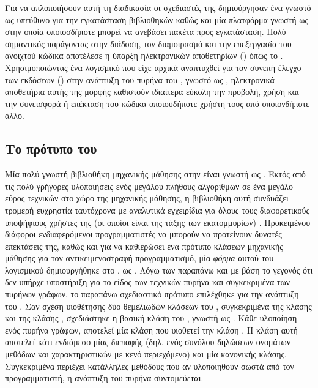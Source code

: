 Για να απλοποιήσουν αυτή τη διαδικασία οι σχεδιαστές της  δημιούργησαν ένα  γνωστό ως  υπεύθυνο για την εγκατάσταση βιβλιοθηκών καθώς και μία πλατφόρμα γνωστή ως  στην οποία οποιοσδήποτε μπορεί να ανεβάσει πακέτα προς εγκατάσταση.
Πολύ σημαντικός παράγοντας στην διάδοση, τον διαμοιρασμό και την επεξεργασία του ανοιχτού κώδικα αποτέλεσε η ύπαρξη ηλεκτρονικών αποθετηρίων () όπως το .
Χρησιμοποιώντας ένα λογισμικό που είχε αρχικά αναπτυχθεί για τον συνεπή έλεγχο των εκδόσεων () στην ανάπτυξη του πυρήνα του , γνωστό ως , ηλεκτρονικά αποθετήρια αυτής της μορφής καθιστούν ιδιαίτερα εύκολη την προβολή, χρήση και την συνεισφορά ή επέκταση του κώδικα οποιουδήποτε χρήστη τους από οποιονδήποτε άλλο.
\subsection{Το πρότυπο του }
Μία πολύ γνωστή βιβλιοθήκη μηχανικής μάθησης στην  είναι γνωστή ως .
Εκτός από τις πολύ γρήγορες υλοποιήσεις ενός μεγάλου πλήθους αλγορίθμων σε ένα μεγάλο εύρος τεχνικών στο χώρο της μηχανικής μάθησης, η βιβλιοθήκη αυτή συνδυάζει τρομερή ευχρηστία ταυτόχρονα με αναλυτικά εγχειρίδια για όλους τους διαφορετικούς υποψήφιους χρήστες της (οι οποίοι είναι της τάξης των εκατομμυρίων) \cite{scikit}.
Προκειμένου διάφοροι ενδιαφερόμενοι προγραμματιστές να μπορούν να προτείνουν δυνατές επεκτάσεις της, καθώς και για να καθιερώσει ένα πρότυπο κλάσεων μηχανικής μάθησης για τον αντικειμενοστραφή προγραμματισμό, μία \textit{φόρμα} αυτού του λογισμικού  δημιουργήθηκε στο , ως .
Λόγω των παραπάνω και με βάση το γεγονός ότι δεν υπήρχε υποστήριξη για το είδος των τεχνικών πυρήνα και συγκεκριμένα των πυρήνων γράφων, το παραπάνω σχεδιαστικό πρότυπο επιλέχθηκε για την ανάπτυξη του .
Σαν σχέση υιοθέτησης δύο θεμελιωδών κλάσεων του \texttt{}, συγκεκριμένα της κλάσης  και της κλάσης , σχεδιάστηκε η βασική κλάση του , γνωστή ως .
Κάθε υλοποίηση ενός πυρήνα γράφων, αποτελεί μία κλάση που υιοθετεί την κλάση . 
Η κλάση αυτή αποτελεί κάτι ενδιάμεσο μίας διεπαφής (δηλ. ενός συνόλου δηλώσεων ονομάτων μεθόδων και χαρακτηριστικών με κενό περιεχόμενο) και μία κανονικής κλάσης.
Συγκεκριμένα περιέχει κατάλληλες μεθόδους που αν υλοποιηθούν σωστά από τον προγραμματιστή, η ανάπτυξη του πυρήνα συντομεύεται.
